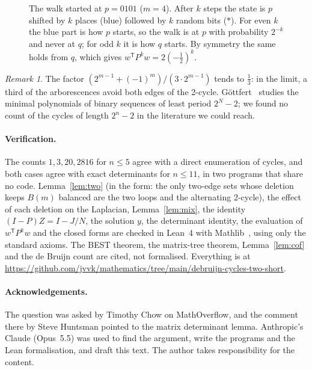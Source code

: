 \documentclass[11pt]{article}
\theoremstyle{remark}
\newtheorem*{remark}{Remark}
\begin{document}
\begin{figure}[ht]
\centering

\caption{The walk started at $p=0101$ ($m=4$). After $k$ steps the state is $p$ shifted by $k$ places (blue)
followed by $k$ random bits ($\ast$). For even $k$ the blue part is how $p$ starts, so the walk is at $p$ with
probability $2^{-k}$ and never at $q$; for odd $k$ it is how $q$ starts. By symmetry the same holds from $q$,
which gives $w^{\mathsf T}P^kw=2(-\frac12)^k$.}
\label{fig:shift}
\end{figure}

\begin{remark}
The factor $(2^{m-1}+(-1)^m)/(3\cdot2^{m-1})$ tends to $\tfrac13$: in the limit, a third of the arborescences
avoid both edges of the 2-cycle. Göttfert~\cite{G06} studies the minimal polynomials of binary sequences of
least period $2^N-2$; we found no count of the cycles of length $2^n-2$ in the literature we could reach.
\end{remark}

\paragraph{Verification.} The counts $1,3,20,2816$ for $n\le5$ agree with a direct enumeration of cycles, and
both cases agree with exact determinants for $n\le11$, in two programs that share no code. Lemma~\ref{lem:two}
(in the form: the only two-edge sets whose deletion keeps $B(m)$ balanced are the two loops and the alternating
2-cycle), the effect of each deletion on the Laplacian, Lemma~\ref{lem:mix}, the identity $(I-P)Z=I-J/N$, the
solution $y$, the determinant identity, the evaluation of $w^{\mathsf T}P^kw$ and the closed forms are checked in
Lean~4 with Mathlib~\cite{mathlib}, using only the standard axioms. The BEST theorem, the matrix-tree theorem,
Lemma~\ref{lem:cof} and the de Bruijn count are cited, not formalised. Everything is at
\url{https://github.com/jvvk/mathematics/tree/main/debruijn-cycles-two-short}.

\paragraph{Acknowledgements.} The question was asked by Timothy Chow on MathOverflow, and the comment there by
Steve Huntsman pointed to the matrix determinant lemma. Anthropic's Claude (Opus~5.5) was used to find the
argument, write the programs and the Lean formalisation, and draft this text. The author takes responsibility
for the content.
\end{document}
